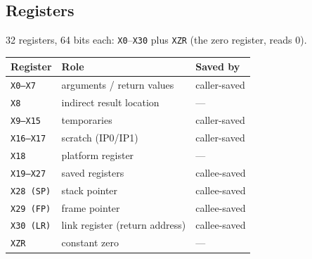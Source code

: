 \documentclass[10pt]{article}
\newcommand{\code}[1]{\texttt{\small #1}}
\begin{document}
\subsection{Registers}
32 registers, 64 bits each: \code{X0}--\code{X30} plus \code{XZR} (the zero register, reads 0).
\begin{center}
\renewcommand{\arraystretch}{1.15}
\begin{tabular}{@{}l l l@{}}
\toprule
\textbf{Register} & \textbf{Role} & \textbf{Saved by}\\
\midrule
\code{X0--X7}   & arguments / return values         & caller-saved\\
\code{X8}       & indirect result location          & ---\\
\code{X9--X15}  & temporaries                       & caller-saved\\
\code{X16--X17} & scratch (IP0/IP1)                 & caller-saved\\
\code{X18}      & platform register                 & ---\\
\code{X19--X27} & saved registers                   & callee-saved\\
\code{X28 (SP)} & stack pointer                     & callee-saved\\
\code{X29 (FP)} & frame pointer                     & callee-saved\\
\code{X30 (LR)} & link register (return address)    & callee-saved\\
\code{XZR}      & constant zero                     & ---\\
\bottomrule
\end{tabular}
\end{center}
\end{document}
